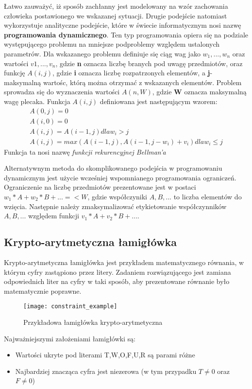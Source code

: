     Łatwo zauważyć, iż sposób zachłanny jest modelowany na wzór zachowania człowieka postawionego we wskazanej sytuacji. Drugie podejście natomiast 
    wykorzystuje analityczne podejście, które w świecie informatycznym nosi nazwę \textbf{programowania dynamicznego}. Ten typ programowania 
    opiera się na podziale występującego problemu na mniejsze podproblemy względem ustalonych parametrów. Dla wskazanego problemu 
    definiuje się ciąg wag jako $w_{1},...,w_{n}$ oraz wartości $v1,...,v_{n}$, gdzie \textbf{n} oznacza liczbę branych pod uwagę przedmiotów, 
    oraz funkcję $A(i,j)$, gdzie \textbf{i} oznacza liczbę rozpatrzonych elementów, a \textbf{j}- maksymalną wartośc, którą można otrzymać z wskazanych 
    elementów. Problem sprowadza się do wyznaczenia wartości $A(n,W)$, gdzie \textbf{W} oznacza maksymalną wagę plecaka.
    Funkcja $A(i,j)$ definiowana jest następującym wzorem:
    \begin{gather}
        \nonumber A(0,j) = 0 \\
        \nonumber A(i,0) = 0 \\
        \nonumber A(i,j) = A(i-1,j) dla w_{i} > j\\
        A(i,j) = max(A(i-1,j), A(i-1,j-w_{i}) + v_{i}) dla w_{i} \leq j
    \end{gather}
    Funkcja ta nosi nazwę \textit{funkcji rekurencyjnej Bellman'a}


    Alternatywnym metoda do skomplikowanego podejścia w programowaniu dynamicznym jest użycie wcześniej wspomnianego programowania ograniczeń.
    Ograniczenie na liczbę przedmiotów prezentowane jest w postaci $w_{1}*A + w_{2}*B + ... =< W$, gdzie współczyniki $A,B,...$ to liczba elementów do wzięcia.
    Następnie należy zmaksymalizować etykietowanie współczynników $A,B,...$ względem funkcji $v_{1} * A + v_{2} * B + ...$.


    \subsection{Krypto-arytmetyczna łamigłówka}
    Krypto-arytmetyczna łamigłówka jest przykładem matematycznego równania, w którym cyfry zastąpiono przez litery. Zadaniem rozwiązującego 
    jest zamiana odpowiednich liter na cyfry w taki sposób, aby prezentowane równanie było matematycznie poprawne.
    \begin{example}
        \begin{figure}[H]
            \texttt{[image: constraint\_example]}
            \centering
            \caption{Przykładowa łamigłówka krypto-arytmetyczna}
        \end{figure} 
    \end{example}
    Najważniejszymi założeniami łamigłówki są:
    \begin{itemize}
        \item Wartości ukryte pod literami T,W,O,F,U,R są parami różne
        \item Najbardziej znacząca cyfra jest niezerowa (w tym przypadku $T \neq 0 $ oraz $F \neq 0$)
    \end{itemize}

